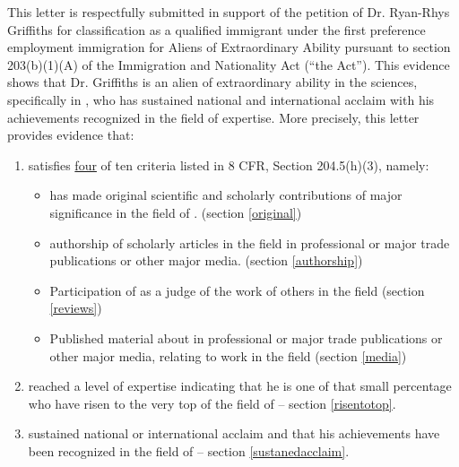 \documentclass[11pt]{article}
\begin{document}
\newcommand{\qu}[1]{\say{\emph{#1}}}

\newcommand{\dg}{(Prof. XYZ, Professor of XYZ, University of XYZ)\\}
\newcommand{\bc}{(Prof. XYZ, Professor of XYZ, University of XYZ)\\}
\newcommand{\pl}{(Prof. XYZ, Professor of XYZ, University of XYZ)\\}
\newcommand{\bw}{(Prof. XYZ, Professor of XYZ, University of XYZ)\\\\}
\newcommand{\sk}{Prof. XYZ, Professor of XYZ, University of XYZ)\\}
\newcommand{\ag}{Prof. XYZ, Professor of XYZ, University of XYZ)\\}

This letter is respectfully submitted in support of the petition of Dr. Ryan-Rhys Griffiths for classification as a qualified immigrant under the first preference employment immigration for Aliens of Extraordinary Ability pursuant to section 203(b)(1)(A) of the Immigration and Nationality Act (“the Act”). This evidence shows that Dr. Griffiths is an alien of extraordinary ability in the sciences, specifically in \underline{\fie{}}, who has sustained national and international acclaim with his achievements recognized in the field of expertise. More precisely, this letter provides evidence that:
\begin{enumerate}
 \item \dr satisfies \underline{four} of ten criteria listed in 8
CFR, Section 204.5(h)(3), namely:
\begin{itemize}
 \item \dr has made original scientific and scholarly contributions of major significance in the field of \fie{}. (section \ref{original})
 \item \drs authorship of scholarly articles in the field in professional or major trade publications or other major media. (section \ref{authorship})
 \item Participation of \dr as a judge of the work of others in the field (section \ref{reviews})
\item Published material about \dr in professional or major trade publications or other major media, relating to \drs work in the field (section \ref{media})
\end{itemize}
 \item \dr reached a level of expertise indicating that he is one of that small percentage who have risen to the very top of the field of \fie{} -- section \ref{risentotop}.
 \item \dr sustained national or international acclaim and that his achievements have been recognized in the field of \fie{} -- section \ref{sustanedacclaim}.
\end{enumerate}
\end{document}
